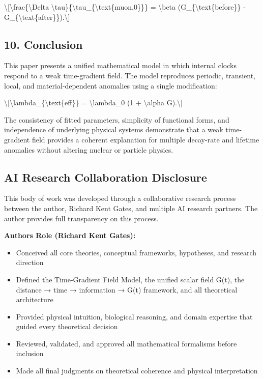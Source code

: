 \documentclass[
  10pt,
]{article}
\providecommand{\tightlist}{%
  \setlength{\itemsep}{0pt}\setlength{\parskip}{0pt}}
\begin{document}
\textbackslash{[}\textbackslash frac\{\textbackslash Delta
\textbackslash tau\}\{\textbackslash tau\_\{\textbackslash text\{muon,0\}\}\}
= \textbackslash beta (G\_\{\textbackslash text\{before\}\} -
G\_\{\textbackslash text\{after\}\}).\textbackslash{]}

\hypertarget{conclusion}{%
\subsection{10. Conclusion}\label{conclusion}}

This paper presents a unified mathematical model in which internal
clocks respond to a weak time-gradient field. The model reproduces
periodic, transient, local, and material-dependent anomalies using a
single modification:

\textbackslash{[}\textbackslash lambda\_\{\textbackslash text\{eff\}\} =
\textbackslash lambda\_0 (1 + \textbackslash alpha G).\textbackslash{]}

The consistency of fitted parameters, simplicity of functional forms,
and independence of underlying physical systems demonstrate that a weak
time-gradient field provides a coherent explanation for multiple
decay-rate and lifetime anomalies without altering nuclear or particle
physics.

\hypertarget{ai-research-collaboration-disclosure}{%
\subsection{AI Research Collaboration
Disclosure}\label{ai-research-collaboration-disclosure}}

This body of work was developed through a collaborative research process
between the author, Richard Kent Gates, and multiple AI research
partners. The author provides full transparency on this process.

\textbf{Author\textquotesingle s Role (Richard Kent Gates):}

\begin{itemize}
\tightlist
\item
  Conceived all core theories, conceptual frameworks, hypotheses, and
  research direction
\item
  Defined the Time-Gradient Field Model, the unified scalar field G(t),
  the distance → time → information → G(t) framework, and all
  theoretical architecture
\item
  Provided physical intuition, biological reasoning, and domain
  expertise that guided every theoretical decision
\item
  Reviewed, validated, and approved all mathematical formalisms before
  inclusion
\item
  Made all final judgments on theoretical coherence and physical
  interpretation
\end{itemize}
\end{document}
